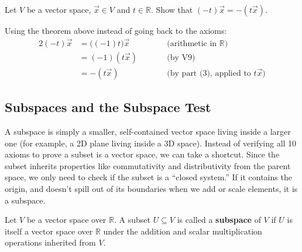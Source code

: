 \begin{example}
Let $V$ be a vector space, $\vec{x} \in V$ and $t \in \mathbb{R}$. Show that $(-t)\vec{x} = -(t\vec{x})$.

\begin{solution}
Using the theorem above instead of going back to the axioms:
\begin{alignat*}{2}
(-t)\vec{x} &= \bigl((-1)t\bigr)\vec{x} &\qquad& \text{(arithmetic in $\mathbb{R}$)} \\
            &= (-1)(t\vec{x})           &&       \text{(by V9)} \\
            &= -(t\vec{x})               &&       \text{(by part (3), applied to $t\vec{x}$)}
\end{alignat*}
\end{solution}
\end{example}

\subsection{Subspaces and the Subspace Test}

\begin{intuition}
A subspace is simply a smaller, self-contained vector space living inside a larger one (for example, a 2D plane living inside a 3D space). Instead of verifying all 10 axioms to prove a subset is a vector space, we can take a shortcut. Since the subset inherits properties like commutativity and distributivity from the parent space, we only need to check if the subset is a ``closed system.'' If it contains the origin, and doesn't spill out of its boundaries when we add or scale elements, it is a subspace.
\end{intuition}

\begin{definition}[Subspace]
Let $V$ be a vector space over $\mathbb{R}$. A subset $U \subseteq V$ is called a \textbf{subspace} of $V$ if $U$ is itself a vector space over $\mathbb{R}$ under the addition and scalar multiplication operations inherited from $V$.
\end{definition}

